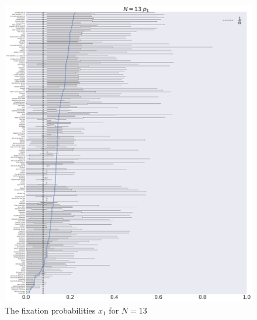 \documentclass[10pt,letterpaper]{article}
\begin{document}
\begin{figure}[!hbtp]
    \centering
    \includegraphics[width=\textwidth]{./boxplot_13_invade.pdf}
    \caption{The fixation probabilities \(x_1\) for \(N=13\)}
\end{figure}
\end{document}
